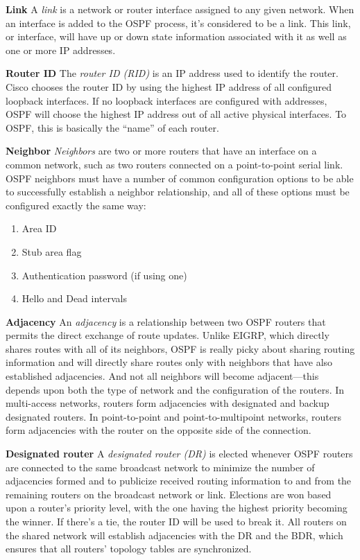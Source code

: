 \textbf{Link} A \emph{link} is a network or router interface assigned to
any given network. When an interface is added to the OSPF process, it's
considered to be a link. This link, or interface, will have up or down
state information associated with it as well as one or more IP
addresses.

\textbf{Router ID} The \emph{router ID (RID)} is an IP address used to
identify the router. Cisco chooses the router ID by using the highest IP
address of all configured loopback interfaces. If no loopback interfaces
are configured with addresses, OSPF will choose the highest IP address
out of all active physical interfaces. To OSPF, this is basically the
``name'' of each router.

\textbf{Neighbor} \emph{Neighbors} are two or more routers that have an
interface on a common network, such as two routers connected on a
point-to-point serial link. OSPF neighbors must have a number of common
configuration options to be able to successfully establish a neighbor
relationship, and all of these options must be configured exactly the
same way:

\begin{enumerate}
\tightlist
\item
  Area ID
\item
  Stub area flag
\item
  Authentication password (if using one)
\item
  Hello and Dead intervals
\end{enumerate}

\textbf{Adjacency} An \emph{adjacency} is a relationship between two
OSPF routers that permits the direct exchange of route updates. Unlike
EIGRP, which directly shares routes with all of its neighbors, OSPF is
really picky about sharing routing information and will directly share
routes only with neighbors that have also established adjacencies. And
not all neighbors will become adjacent---this depends upon both the type
of network and the configuration of the routers. In multi-access
networks, routers form adjacencies with designated and backup designated
routers. In point-to-point and point-to-multipoint networks, routers
form adjacencies with the router on the opposite side of the connection.

\textbf{Designated router} A \emph{designated router (DR)} is elected
whenever OSPF routers are connected to the same broadcast network to
minimize the number of adjacencies formed and to publicize received
routing information to and from the remaining routers on the broadcast
network or link. Elections are won based upon a router's priority level,
with the one having the highest priority becoming the winner. If there's
a tie, the router ID will be used to break it. All routers on the shared
network will establish adjacencies with the DR and the BDR, which
ensures that all routers' topology tables are synchronized.

